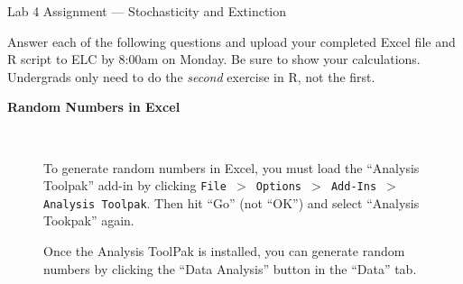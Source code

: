\documentclass[12pt]{article}\usepackage[]{graphicx}\usepackage[]{xcolor}
\begin{document}
{
  \Large
  \centering
  Lab 4 Assignment --- Stochasticity and Extinction \par
  \normalsize
  Answer each of the following questions and upload your completed Excel
  file and R script to ELC by 8:00am on Monday. Be sure to show your
  calculations. Undergrads only need to do the \textit{second}
  exercise in R, not the first. \\
}

\vspace{12pt}

{\bf Random Numbers in Excel \\}

\begin{figure}[h]
  \centering
   \\
  \caption{To generate random numbers in Excel, you must load the
    ``Analysis Toolpak'' add-in by clicking
    {\tt File $>$ Options $>$ Add-Ins $>$ Analysis Toolpak}. Then hit
    ``Go'' (not ``OK'') and select ``Analysis Tookpak'' again.}
  \label{fig:rng}
\end{figure}

\clearpage

\begin{figure}[h]
  \centering
  \caption{\footnotesize Once the Analysis ToolPak is installed, you can generate
    random numbers by clicking the ``Data Analysis'' button in the
    ``Data'' tab.
  }
  \label{fig:rng-2}
\end{figure}
\end{document}
